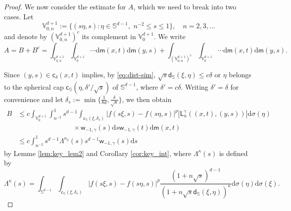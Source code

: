 \documentclass{amsart}
\theoremstyle{remark}
\def\d{\mathrm{d}}
\def\sph{{\mathbb{S}^{d-1}}}
\def\g{{\gamma}}
\def\k{{\kappa}}
\def\s{\sigma}
\def\SS{{\mathbb S}}
\def\VV{{\mathbb V}}
\def\d{\mathrm{d}}
\def\sph{{\mathbb{S}^{d-1}}}
\def\sL{{\mathsf L}}
\def\sc{{\mathsf c}}
\def\sd{{\mathsf d}}
\def\sm{{\mathsf m}}
\def\sw{{\mathsf w}}
\def\g{{\gamma}}
\def\k{{\kappa}}
\def\s{\sigma}
\def\SS{{\mathbb S}}
\def\VV{{\mathbb V}}
\def\f{\frac}
\def\f{\frac}
\begin{document}
\begin{proof}
We now consider the estimate for $A$, which we need to break into two cases. Let 
$$
   \VV_{0,n}^{d+1}:= \{(s \eta,s): \eta \in \sph, \,\, n^{-2} \le s \le 1\}, \quad n = 2, 3, \ldots 
$$
and denote by $(\VV_{0,n}^{d+1})^c$ its complement in $\VV_0^{d+1}$. We write 
$$
 A = B+ B^c = \int_{\VV_{0,n}^{d+1}}   \int_{\VV_0^{d+1}} \cdots   \d \sm(x,t)\d\sm(y,s) + 
 \int_{(\VV_{0,n}^{d+1})^c}   \int_{\VV_0^{d+1}} \cdots   \d \sm(x,t)\d\sm(y,s).
$$

Since $(y,s) \in \sc_\delta(x,t)$ implies, by \eqref{eq:dist-sim},
$\sqrt{s} \sd_{\SS}(\xi,\eta) \le c \delta$ or $\eta$ belongs to the spherical cap $\sc_\SS(\eta, \delta'/\sqrt{s})$ 
of $\sph$, where $\delta' = c \delta$. Writing $\delta'  =\delta$ for convenience and let $\delta_s:= \min\{\f1{8 d}, \frac{\delta}{\sqrt{s}}\}$, we then obtain
\begin{align*}
  B & \le c \int_{\VV_0^{d+1}} \int_{n^{-2}}^1 s^{d-1} \int_{\sc_\SS(\xi, \delta_s)} |f(s\xi,s) - f(s\eta,s)|^p 
       |\sL_{n}^{\gamma}\left( (x,t),(y,s)\right)|\d \s(\eta)     \\ 
            &  \qquad\qquad\qquad\qquad \times   \sw_{-1,\gamma}(s) \d s \sw_{-1,\gamma}(t) \d \sm(x,t) \\
    &  \le c \int_{n^{-2}}^1 s^{d-1} \Lambda^{\k_2}(s) s^{d-1} \sw_{-1,\g}(s) \d s     
\end{align*}
by Lemme \ref{lem:key_lem2} and Corollary \ref{cor:key_int}, where $\Lambda^\k(s)$ is defined by 
$$
  \Lambda^\k(s)= \int_\sph  \int_{\sc_\SS(\xi, \delta_s)} |f(s\xi,s) - f(s\eta,s)|^p \frac{(1+n \sqrt{s})^{d-1}}
         {(1+ n \sqrt{s} \sd_\SS(\xi,\eta))^\k}  \d \s(\eta)  \d \s(\xi).
$$


\end{proof}
\end{document}
